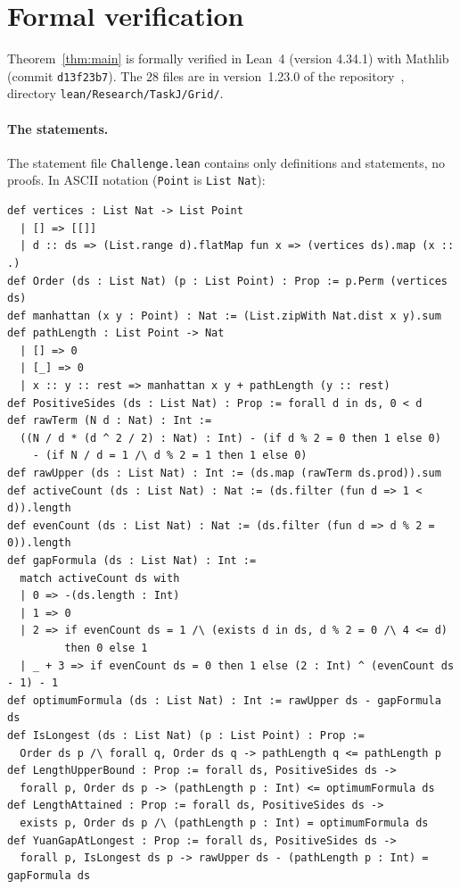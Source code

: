 \documentclass[11pt]{article}
\theoremstyle{remark}
\newcommand{\repoversion}{1.23.0}
\begin{document}
\section{Formal verification}\label{sec:lean}

Theorem~\ref{thm:main} is formally verified in Lean~4 (version 4.34.1) with
Mathlib~\cite{mathlib} (commit \texttt{d13f23b7}). The $28$ files are in
version~\repoversion{} of the repository~\cite{repo}, directory
\texttt{lean/Research/TaskJ/Grid/}.

\paragraph{The statements.}
The statement file \texttt{Challenge.lean} contains only definitions and
statements, no proofs. In ASCII notation (\texttt{Point} is \texttt{List Nat}):
{\footnotesize
\begin{verbatim}
def vertices : List Nat -> List Point
  | [] => [[]]
  | d :: ds => (List.range d).flatMap fun x => (vertices ds).map (x :: .)
def Order (ds : List Nat) (p : List Point) : Prop := p.Perm (vertices ds)
def manhattan (x y : Point) : Nat := (List.zipWith Nat.dist x y).sum
def pathLength : List Point -> Nat
  | [] => 0
  | [_] => 0
  | x :: y :: rest => manhattan x y + pathLength (y :: rest)
def PositiveSides (ds : List Nat) : Prop := forall d in ds, 0 < d
def rawTerm (N d : Nat) : Int :=
  ((N / d * (d ^ 2 / 2) : Nat) : Int) - (if d % 2 = 0 then 1 else 0)
    - (if N / d = 1 /\ d % 2 = 1 then 1 else 0)
def rawUpper (ds : List Nat) : Int := (ds.map (rawTerm ds.prod)).sum
def activeCount (ds : List Nat) : Nat := (ds.filter (fun d => 1 < d)).length
def evenCount (ds : List Nat) : Nat := (ds.filter (fun d => d % 2 = 0)).length
def gapFormula (ds : List Nat) : Int :=
  match activeCount ds with
  | 0 => -(ds.length : Int)
  | 1 => 0
  | 2 => if evenCount ds = 1 /\ (exists d in ds, d % 2 = 0 /\ 4 <= d)
         then 0 else 1
  | _ + 3 => if evenCount ds = 0 then 1 else (2 : Int) ^ (evenCount ds - 1) - 1
def optimumFormula (ds : List Nat) : Int := rawUpper ds - gapFormula ds
def IsLongest (ds : List Nat) (p : List Point) : Prop :=
  Order ds p /\ forall q, Order ds q -> pathLength q <= pathLength p
def LengthUpperBound : Prop := forall ds, PositiveSides ds ->
  forall p, Order ds p -> (pathLength p : Int) <= optimumFormula ds
def LengthAttained : Prop := forall ds, PositiveSides ds ->
  exists p, Order ds p /\ (pathLength p : Int) = optimumFormula ds
def YuanGapAtLongest : Prop := forall ds, PositiveSides ds ->
  forall p, IsLongest ds p -> rawUpper ds - (pathLength p : Int) = gapFormula ds
\end{verbatim}}
\end{document}
